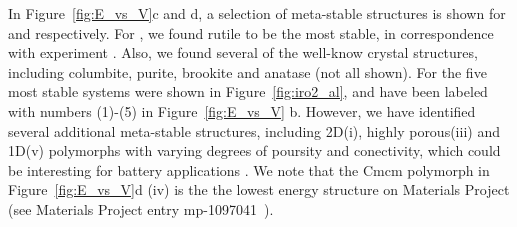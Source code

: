 In Figure~\ref{fig:E_vs_V}c and d, a selection of meta-stable structures is shown for \IrOtwo and \IrOthree respectively.
%
For \IrOtwo, we found rutile to be the most stable,
in correspondence with experiment \cite{}.
%
Also, we found several of the well-know \IrOtwo crystal structures, including columbite, purite, brookite and anatase (not all shown).
%
For \IrOthree the five most stable systems were shown in Figure~\ref{fig:iro2_al},
and have been labeled with numbers (1)-(5) in Figure~\ref{fig:E_vs_V} b.
%
However, we have identified several additional meta-stable structures, including 2D(i), highly porous(iii) and 1D(v) polymorphs with varying degrees of poursity and conectivity,
which could be interesting for battery applications \cite{}.
%
We note that the \IrOthree Cmcm polymorph in Figure~\ref{fig:E_vs_V}d (iv) is the the lowest energy \IrOthree structure on Materials Project
(see Materials Project entry mp-1097041~\cite{mp-1097041}).



